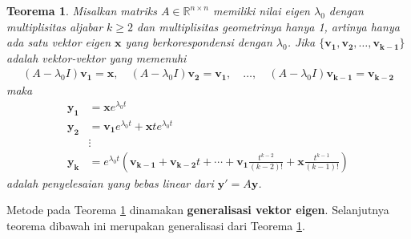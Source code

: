 \documentclass[a4paper]{article}
\theoremstyle{definisi}
\newtheorem{teorema}{Teorema}[section]
\numberwithin{equation}{section}
\newcommand{\R}{\mathbb{R}}
\begin{document}
  \begin{teorema}\label{thm:multiplisitas_geometri_satu}
    Misalkan matriks $A\in\R^{n\times n}$ memiliki nilai eigen $\lambda_0$ dengan multiplisitas aljabar $k\geq 2$ dan multiplisitas geometrinya hanya 1, artinya hanya ada satu vektor eigen $\mathbf{x}$ yang berkorespondensi dengan $\lambda_0$. Jika $\{\mathbf{v_1},\mathbf{v_2},\ldots,\mathbf{v_{k-1}}\}$ adalah vektor-vektor yang memenuhi
    \begin{equation*}
      \begin{split}
        (A-\lambda_0I)\mathbf{v_1}=\mathbf{x},\quad
        (A-\lambda_0I)\mathbf{v_2}=\mathbf{v_1}
        ,\quad\dots,\quad
        (A-\lambda_0I)\mathbf{v_{k-1}}=\mathbf{v_{k-2}}
      \end{split}
    \end{equation*}
    maka
    \begin{equation*}
      \begin{split}
        \mathbf{y_1}&=\mathbf{x}e^{\lambda_0t}\\
        \mathbf{y_2}&=\mathbf{v_1}e^{\lambda_0t}+\mathbf{x}te^{\lambda_0t}\\
        &\vdots\\
        \mathbf{y_{k}}&=e^{\lambda_0t}\left(\mathbf{v_{k-1}}+\mathbf{v_{k-2}}t+\cdots+\mathbf{v_1}\frac{t^{k-2}}{(k-2)!}+\mathbf{x}\frac{t^{k-1}}{(k-1)!}\right)
      \end{split}
    \end{equation*}
    adalah penyelesaian yang bebas linear dari $\mathbf{y'}=A\mathbf{y}$.
  \end{teorema}
  Metode pada Teorema \ref{thm:multiplisitas_geometri_satu} dinamakan \textbf{generalisasi vektor eigen}. Selanjutnya teorema dibawah ini merupakan generalisasi dari Teorema \ref{thm:multiplisitas_geometri_satu}.
\end{document}
